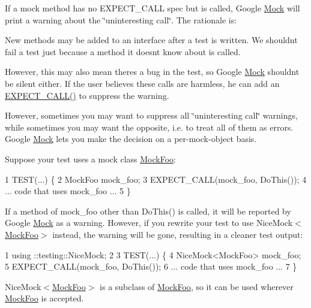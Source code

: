 If a mock method has no {\ttfamily E\+X\+P\+E\+C\+T\+\_\+\+C\+A\+LL} spec but is called, Google \hyperlink{classMock}{Mock} will print a warning about the \char`\"{}uninteresting call\char`\"{}. The rationale is\+:


\begin{DoxyItemize}
\item New methods may be added to an interface after a test is written. We shouldn\textquotesingle{}t fail a test just because a method it doesn\textquotesingle{}t know about is called.
\item However, this may also mean there\textquotesingle{}s a bug in the test, so Google \hyperlink{classMock}{Mock} shouldn\textquotesingle{}t be silent either. If the user believes these calls are harmless, he can add an {\ttfamily \hyperlink{gmock-spec-builders_8h_a535a6156de72c1a2e25a127e38ee5232}{E\+X\+P\+E\+C\+T\+\_\+\+C\+A\+L\+L()}} to suppress the warning.
\end{DoxyItemize}

However, sometimes you may want to suppress all \char`\"{}uninteresting call\char`\"{} warnings, while sometimes you may want the opposite, i.\+e. to treat all of them as errors. Google \hyperlink{classMock}{Mock} lets you make the decision on a per-\/mock-\/object basis.

Suppose your test uses a mock class {\ttfamily \hyperlink{classMockFoo}{Mock\+Foo}}\+:


\begin{DoxyCode}
1 TEST(...) \{
2   MockFoo mock\_foo;
3   EXPECT\_CALL(mock\_foo, DoThis());
4   ... code that uses mock\_foo ...
5 \}
\end{DoxyCode}


If a method of {\ttfamily mock\+\_\+foo} other than {\ttfamily Do\+This()} is called, it will be reported by Google \hyperlink{classMock}{Mock} as a warning. However, if you rewrite your test to use {\ttfamily Nice\+Mock$<$\hyperlink{classMockFoo}{Mock\+Foo}$>$} instead, the warning will be gone, resulting in a cleaner test output\+:


\begin{DoxyCode}
1 using ::testing::NiceMock;
2 
3 TEST(...) \{
4   NiceMock<MockFoo> mock\_foo;
5   EXPECT\_CALL(mock\_foo, DoThis());
6   ... code that uses mock\_foo ...
7 \}
\end{DoxyCode}


{\ttfamily Nice\+Mock$<$\hyperlink{classMockFoo}{Mock\+Foo}$>$} is a subclass of {\ttfamily \hyperlink{classMockFoo}{Mock\+Foo}}, so it can be used wherever {\ttfamily \hyperlink{classMockFoo}{Mock\+Foo}} is accepted.

